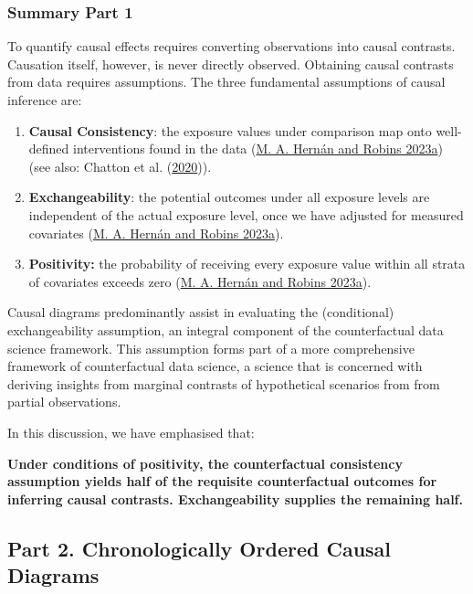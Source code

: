 \documentclass[
  singlecolumn]{article}
\begin{document}
\hypertarget{summary-part-1}{%
\subsubsection{Summary Part 1}\label{summary-part-1}}

To quantify causal effects requires converting observations into causal
contrasts. Causation itself, however, is never directly observed.
Obtaining causal contrasts from data requires assumptions. The three
fundamental assumptions of causal inference are:

\begin{enumerate}
\def\labelenumi{\arabic{enumi}.}
\item
  \textbf{Causal Consistency}: the exposure values under comparison map
  onto well-defined interventions found in the data
  (\protect\hyperlink{ref-hernuxe1n2023}{M. A. Hernán and Robins 2023a})
  (see also: Chatton et al.
  (\protect\hyperlink{ref-chatton2020}{2020})).
\item
  \textbf{Exchangeability}: the potential outcomes under all exposure
  levels are independent of the actual exposure level, once we have
  adjusted for measured covariates
  (\protect\hyperlink{ref-hernuxe1n2023}{M. A. Hernán and Robins
  2023a}).
\item
  \textbf{Positivity:} the probability of receiving every exposure value
  within all strata of covariates exceeds zero
  (\protect\hyperlink{ref-hernuxe1n2023}{M. A. Hernán and Robins
  2023a}).
\end{enumerate}

Causal diagrams predominantly assist in evaluating the (conditional)
exchangeability assumption, an integral component of the counterfactual
data science framework. This assumption forms part of a more
comprehensive framework of counterfactual data science, a science that
is concerned with deriving insights from marginal contrasts of
hypothetical scenarios from from partial observations.

In this discussion, we have emphasised that:

\textbf{Under conditions of positivity, the counterfactual consistency
assumption yields half of the requisite counterfactual outcomes for
inferring causal contrasts. Exchangeability supplies the remaining
half.}

\hypertarget{part-2.-chronologically-ordered-causal-diagrams}{%
\subsection{Part 2. Chronologically Ordered Causal
Diagrams}\label{part-2.-chronologically-ordered-causal-diagrams}}
\end{document}
